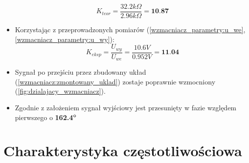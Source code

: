 \begin{itemize}
        \begin{equation}
            K_{teor} = \dfrac{32.2k\Omega}{2.96k\Omega} = \textbf{10.87} 
        \end{equation}
    \item Korzystając z przeprowadzonych pomiarów (\ref{wzmacniacz_parametry:u_we}, \ref{wzmacniacz_parametry:u_wy}):
        \begin{equation}
            K_{eksp} = \dfrac{U_{wy}}{U_{we}} = \dfrac{10.6V}{0.952V} = \textbf{11.04}
        \end{equation}
    \item Sygnał po przejściu przez zbudowany układ (\ref{wzmacniacz:zmontowany_uklad}) zostaje poprawnie wzmocniony (\ref{fig:dzialajacy_wzmacniacz}).
    \item Zgodnie z założeniem sygnał wyjściowy jest przesunięty w fazie względem pierwszego o \textbf{162.4}$\boldsymbol{\degree}$
\end{itemize}

\section{Charakterystyka częstotliwościowa}

